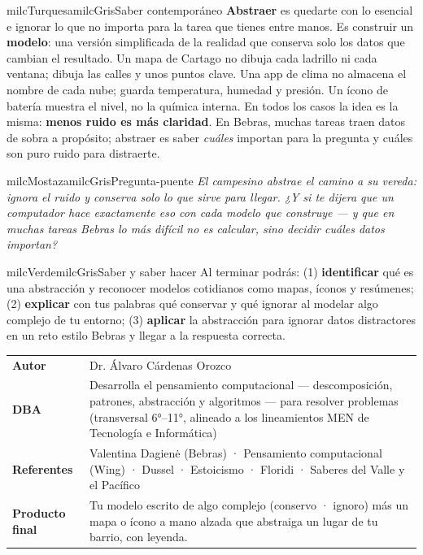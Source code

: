 \documentclass[11pt,letterpaper]{article}
\begin{document}
\begin{softbox}{milcTurquesa}{milcGris}{Saber contemporáneo}
\textbf{Abstraer} es quedarte con lo esencial e ignorar lo que no importa
para la tarea que tienes entre manos. Es construir un \textbf{modelo}: una
versión simplificada de la realidad que conserva solo los datos que
cambian el resultado. Un mapa de Cartago no dibuja cada ladrillo ni cada
ventana; dibuja las calles y unos puntos clave. Una app de clima no
almacena el nombre de cada nube; guarda temperatura, humedad y presión.
Un ícono de batería muestra el nivel, no la química interna. En todos los
casos la idea es la misma: \textbf{menos ruido es más claridad}. En Bebras,
muchas tareas traen datos de sobra a propósito; abstraer es saber
\emph{cuáles} importan para la pregunta y cuáles son puro ruido para
distraerte.
\end{softbox}

\begin{softbox}{milcMostaza}{milcGris}{Pregunta-puente}
\textit{El campesino abstrae el camino a su vereda: ignora el ruido y conserva
solo lo que sirve para llegar. ¿Y si te dijera que un computador hace
exactamente eso con cada modelo que construye --- y que en muchas tareas
Bebras lo más difícil no es calcular, sino decidir \emph{cuáles} datos
importan?}
\end{softbox}

\begin{softbox}{milcVerde}{milcGris}{Saber y saber hacer}
Al terminar podrás: (1) \textbf{identificar} qué es una abstracción y
reconocer modelos cotidianos como mapas, íconos y resúmenes; (2)
\textbf{explicar} con tus palabras qué conservar y qué ignorar al
modelar algo complejo de tu entorno; (3) \textbf{aplicar} la abstracción
para ignorar datos distractores en un reto estilo Bebras y llegar a la
respuesta correcta.
\end{softbox}



\small
\begin{tabularx}{\textwidth}{>{\bfseries}p{3.0cm}Y}
Autor & Dr. Álvaro Cárdenas Orozco\\
DBA & Desarrolla el pensamiento computacional --- descomposición, patrones, abstracción y algoritmos --- para resolver problemas (transversal 6°--11°, alineado a los lineamientos MEN de Tecnología e Informática)\\
Referentes & Valentina Dagienė (Bebras) · Pensamiento computacional (Wing) · Dussel · Estoicismo · Floridi · Saberes del Valle y el Pacífico\\
Producto final & Tu modelo escrito de algo complejo (conservo · ignoro) más un mapa o ícono a mano alzada que abstraiga un lugar de tu barrio, con leyenda.\\
\end{tabularx}
\normalsize
\end{document}
